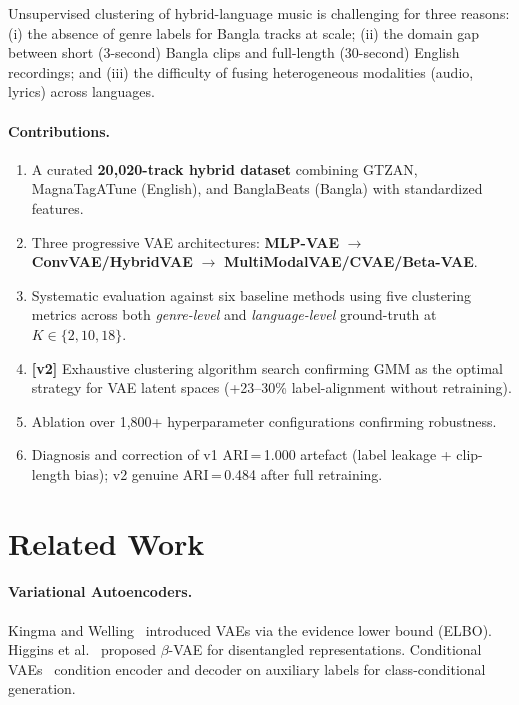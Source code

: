 \documentclass{article}
\begin{document}
Unsupervised clustering of hybrid-language music is challenging for three reasons:
(i) the absence of genre labels for Bangla tracks at scale;
(ii) the domain gap between short (3-second) Bangla clips and full-length
(30-second) English recordings; and
(iii) the difficulty of fusing heterogeneous modalities (audio, lyrics) across languages.

\paragraph{Contributions.}
\begin{enumerate}
    \item A curated \textbf{20,020-track hybrid dataset} combining GTZAN, MagnaTagATune
          (English), and BanglaBeats (Bangla) with standardized features.
    \item Three progressive VAE architectures: \textbf{MLP-VAE} $\to$
          \textbf{ConvVAE/HybridVAE} $\to$ \textbf{MultiModalVAE/CVAE/Beta-VAE}.
    \item Systematic evaluation against six baseline methods using five clustering
          metrics across both \emph{genre-level} and \emph{language-level} ground-truth
          at $K\!\in\!\{2,10,18\}$.
    \item \textbf{[v2]} Exhaustive clustering algorithm search confirming GMM as the
          optimal strategy for VAE latent spaces (+23--30\% label-alignment without
          retraining).
    \item Ablation over 1,800+ hyperparameter configurations confirming robustness.
    \item Diagnosis and correction of v1 ARI\,=\,1.000 artefact (label leakage +
          clip-length bias); v2 genuine ARI\,=\,0.484 after full retraining.
\end{enumerate}

\section{Related Work}

\paragraph{Variational Autoencoders.}
Kingma and Welling~\cite{kingma2013auto} introduced VAEs via the evidence lower bound
(ELBO). Higgins et al.~\cite{higgins2017betavae} proposed $\beta$-VAE for disentangled
representations. Conditional VAEs~\cite{sohn2015learning} condition encoder and decoder
on auxiliary labels for class-conditional generation.
\end{document}
